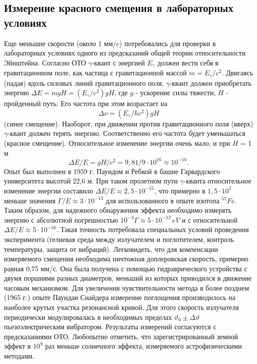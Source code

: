 \documentclass{article}
\begin{document}
\subsection{Измерение красного смещения в лабораторных условиях}
\hspace{12pt} Еще меньшие скорости (около 1 мм/c) потребовались для проверки в лабораторных условиях одного из предсказаний общей теории относительности Эйнштейна. Согласно ОТО $\gamma$-квант с энергией $E_{\gamma}$ должен вести себя в гравитационном поле, как частица с гравитационной массой $m = E_{\gamma} / c^2$. Двигаясь (падая) вдоль силовых линий гравитационного поля, $\gamma$-квант должен приобретать энергию $\Delta E = mgH = (E_{\gamma} / c^2)gH$, где $g$ - ускорение силы тяжести, $H$ - пройденный путь. Его частота при этом возрастает на
$$ \Delta \nu = (E_{\gamma}/hc^2)gH $$
(синее смещение).
\indent Наоборот, при движении против гравитационного поля (вверх) $\gamma$-квант должен терять энергию. Соответственно его частота будет уменьшаться (красное смещение). Относительное изменение энергии очень мало, и при $H$ = 1 м
$$ \Delta E/E = gH/c^2 = 9,81/9\cdot 10^{16} \approx 10^{-16} .$$
\indent Опыт был выполнен в 1959 г. Паундом и Ребкой в башне Гарвардского университета высотой 22,6 м. При таком пролетном пути $\gamma$-кванта относительное изменение энергии составило $\Delta E/E \approx 2,5 \cdot 10^{-15}$, что примерно в $1,5 \cdot 10^{2}$ меньше значения $\Gamma/E \approx 3 \cdot 10^{-13}$ для использованного в опыте изотопа $^{57}Fe$. Таким образом, для надежного обнаружения эффекта необходимо измерять энергию с абсолютной погрешностью $10^{-3} \Gamma \approx 5 \cdot 10^{-12} \hspace{2pt} eV$ и с относительной $\Delta E/E \approx 5 \cdot 10^{-16}$. Такая точность потребовала специальных условий проведения эксперимента (гелиевая среда между излучателем и поглотителем, контроль температуры, защита от вибраций). Легковидеть, что для компенсации измеряемого смещения необходима ничтожная доплеровская скорость, примерно равная 0,75 мм/с. Она была получена с помощью гидраврического устройства с двумя поршнями разных диаметров, меньший из которых приводился в движение часовым механизмом. Для увеличения чувствительности метода в более позднем (1965 г.) опыте Паундаи Снайдера измерение поглощения производилось на наиболее крутых участка резонансной кривой. Для этого скорость излучателя периодически модулировалась в необходимых пределах $\vartheta_{0} \pm \Delta \vartheta$ пьезоэлектрическим вибратором. Результаты измерений согласуются с предсказаниями ОТО. Любопытно отметить, что зарегистрированный земной эффект в $10^{9}$ раз меньше солнечного эффекта, измеряемого астрофизическими методами.
\end{document}
